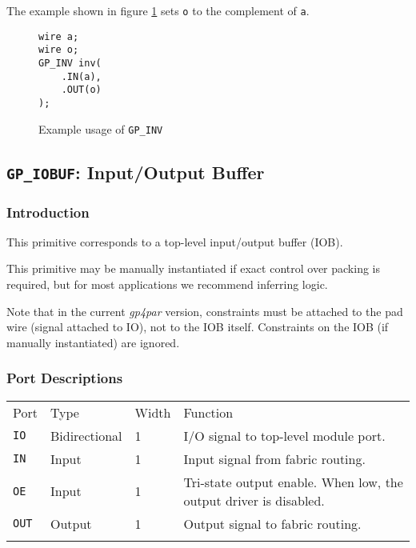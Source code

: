 \documentclass[11pt]{article}
\newcommand{\namestyle}[1]{\textit{#1}}
\newcommand{\tokenstyle}[1]{\texttt{#1}}
\newcommand{\wirestyle}[1]{\texttt{#1}}
\newcommand{\whenstyle}[1]{{\fontseries{sb}\selectfont#1}}
\newcommand{\thinhline}{\Xhline{1\arrayrulewidth}}
\newcommand{\thickhline}{\Xhline{2.5\arrayrulewidth}}
\begin{document}
The example shown in figure \ref{gp-inv-example} sets \wirestyle{o} to the complement of \wirestyle{a}.

\begin{figure}[h]
\begin{lstlisting}
wire a;
wire o;
GP_INV inv(
	.IN(a),
	.OUT(o)
);
\end{lstlisting}
\caption{Example usage of \tokenstyle{GP\_INV}}
\label{gp-inv-example}
\end{figure}


\pagebreak
\subsection{\tokenstyle{GP\_IOBUF}: Input/Output Buffer}
\label{gp-iobuf}

\subsubsection{Introduction}
This primitive corresponds to a top-level input/output buffer (IOB).

This primitive may be manually instantiated if exact control over packing is required, but for most applications we
recommend inferring logic.

Note that in the current \namestyle{gp4par} version, constraints must be attached to the pad wire (signal attached to IO), not to the IOB itself. Constraints on the IOB (if manually instantiated) are ignored.

\subsubsection{Port Descriptions}

\begin{tabularx}{\textwidth}{lllX}
\thinhline
\whenstyle{Port} & \whenstyle{Type} & \whenstyle{Width} & \whenstyle{Function} \\
\thickhline
\tokenstyle{IO} & Bidirectional & 1 & I/O signal to top-level module port. \\
\thinhline
\tokenstyle{IN} & Input & 1 & Input signal from fabric routing. \\
\thinhline
\tokenstyle{OE} & Input & 1 & Tri-state output enable. When low, the output driver is disabled. \\
\thinhline
\tokenstyle{OUT} & Output & 1 & Output signal to fabric routing. \\
\thinhline
\end{tabularx}
\end{document}
